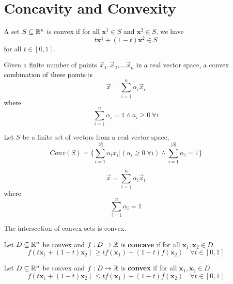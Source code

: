 \documentclass{article}
\begin{document}
	\section{Concavity and Convexity}
		\begin{definition}
			A set $S \subseteq \mathbb{R}^n$ is convex if for all $\textbf{x}^1 \in S$ and $\textbf{x}^2 \in S$, we have
			\[
				t \textbf{x}^1 + (1-t)\textbf{x}^2 \in S
			\]
			for all $t \in [0, 1]$.
		\end{definition}
		
		\begin{definition}
			Given a finite number of points $\vec{x}_1, \vec{x}_2, \dots \vec{x}_n$ in a real vector space, a convex combination of these points is
			\[
				\vec{x} = \sum_{i=1}^n \alpha_i \vec{x}_i
			\]
			where 
			\[
				\sum_{i=1}^n \alpha_i = 1 \land a_i \geq 0\ \forall i
			\]
		\end{definition}
		
		\begin{definition}
			Let $S$ be a finite set of vectors from a real vector space,
			\[
				Conv(S) = \Big \{
					\sum_{i=1}^{|S|} \alpha_i x_i \Big | (\alpha_i \geq 0\ \forall i) \land \sum_{i=1}^{|S|} \alpha_i = 1
				\Big \}
			\]
		\end{definition}
		
		\begin{definition}
			\[
				\vec{x} = \sum_{i=1}^n \alpha_i \vec{x}_i
			\]
			where 
			\[
				\sum_{i=1}^n \alpha_i = 1
			\]
		\end{definition}
		
		\begin{proposition}
			The intersection of convex sets is convex.
		\end{proposition}
		
		\begin{definition}
			Let $D \subseteq \mathbb{R}^n$ be convex and $f: D\to \mathbb{R}$ is \textbf{concave} if for all $\textbf{x}_1, \textbf{x}_2 \in D$
			\[
				f(t \textbf{x}_1 + (1-t) \textbf{x}_2) \geq t f(\textbf{x}_1) + (1-t) f(\textbf{x}_2)\quad \forall t \in [0, 1]
			\]
		\end{definition}
		
		\begin{definition}
			Let $D \subseteq \mathbb{R}^n$ be convex and $f: D\to \mathbb{R}$ is \textbf{convex} if for all $\textbf{x}_1, \textbf{x}_2 \in D$
			\[
				f(t \textbf{x}_1 + (1-t) \textbf{x}_2) \leq t f(\textbf{x}_1) + (1-t) f(\textbf{x}_2)\quad \forall t \in [0, 1]
			\]
		\end{definition}
		
\end{document}
